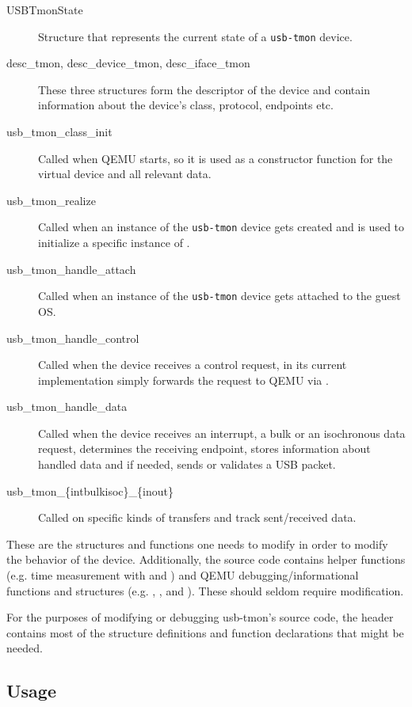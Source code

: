 \begin{description}
	\item[USBTmonState]
		Structure that represents the current state of a \texttt{usb-tmon}
		device.
	\item[desc\_tmon, desc\_device\_tmon, desc\_iface\_tmon]
		These three structures form the descriptor of the device and contain
		information about the device's class, protocol, endpoints etc.
	\item[usb\_tmon\_class\_init]
		Called when QEMU starts, so it is used as a constructor function for the
		virtual device and all relevant data.
	\item[usb\_tmon\_realize]
		Called when an instance of the \texttt{usb-tmon} device gets created and
		is used to initialize a specific instance of .
	\item[usb\_tmon\_handle\_attach]
		Called when an instance of the \texttt{usb-tmon} device gets attached to
		the guest OS.
	\item[usb\_tmon\_handle\_control]
		Called when the device receives a control request, in its current
		implementation simply forwards the request to QEMU via
		.
	\item[usb\_tmon\_handle\_data]
		Called when the device receives an interrupt, a bulk or an isochronous
		data request, determines the receiving endpoint, stores information
		about handled data and if needed, sends or validates a USB packet.
	\item[usb\_tmon\_\{int\textbar bulk\textbar isoc\}\_\{in\textbar out\}]
		Called on specific kinds of transfers and track sent/received data.
\end{description}

These are the structures and functions one needs to modify in order to modify
the behavior of the device. Additionally, the source code contains helper
functions (e.g. time measurement with  and )
and QEMU debugging/informational functions and structures (e.g.
, ,  and
). These should seldom require modification.

For the purposes of modifying or debugging usb-tmon's source code, the header
 contains most of the structure definitions
and function declarations that might be needed.

\subsection{Usage}

